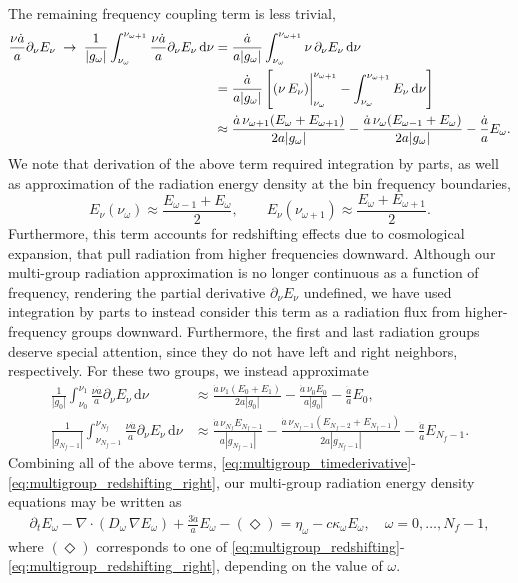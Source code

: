 \documentclass[10pt]{article}
\renewcommand{\(}{\left(}
\renewcommand{\)}{\right)}
\newcommand{\adot}{\dot{a}}
\newcommand{\Enu}{E_{\nu}}
\begin{document}
The remaining frequency coupling term is less trivial,
\begin{align}
\notag
   \frac{\nu \adot}{a}\partial_{\nu}\Enu \;\rightarrow\;
   \frac{1}{|g_{\omega}|} \int_{\nu_{\omega}}^{\nu_{\omega+1}} \frac{\nu \adot}{a}\partial_{\nu}\Enu\,\mathrm d\nu
   &=
   \frac{\adot}{a|g_{\omega}|} \int_{\nu_{\omega}}^{\nu_{\omega+1}} \nu\,\partial_{\nu}\Enu\,\mathrm d\nu \\
\label{eq:multigroup_redshifting}
   &=
   \frac{\adot}{a|g_{\omega}|}
   \left[(\nu\,\Enu)\bigg\vert_{\nu_{\omega}}^{\nu_{\omega+1}} - \int_{\nu_{\omega}}^{\nu_{\omega+1}} \Enu\,\mathrm d\nu\right]\\
\notag
   &\approx
   \frac{\adot\, \nu_{\omega+1} (E_{\omega}+E_{\omega+1})}{2a|g_{\omega}|} -
   \frac{\adot\, \nu_{\omega} (E_{\omega-1}+E_{\omega})}{2a|g_{\omega}|} - \frac{\adot}{a}E_{\omega}.
\end{align}
We note that derivation of the above term required integration by
parts, as well as approximation of the radiation energy density at the
bin frequency boundaries, 
\[
   \Enu(\nu_{\omega}) \approx \frac{E_{\omega-1}+E_{\omega}}{2}, \qquad
   \Enu(\nu_{\omega+1}) \approx \frac{E_{\omega}+E_{\omega+1}}{2}.
\]
Furthermore, this term accounts for redshifting
effects due to cosmological expansion, that pull radiation from higher
frequencies downward.  Although our multi-group radiation approximation
is no longer continuous as a function of frequency, rendering the
partial derivative $\partial_\nu\Enu$ undefined, we have used
integration by parts to instead consider this term as a radiation flux
from higher-frequency groups downward.  Furthermore, the first and
last radiation groups deserve special attention, since they do not
have left and right neighbors, respectively.  For these two groups, we
instead approximate
\begin{align}
 \label{eq:multigroup_redshifting_left}
   \frac{1}{|g_0|} \int_{\nu_0}^{\nu_1} \frac{\nu \adot}{a}\partial_{\nu}\Enu\,\mathrm d\nu
   &\approx
   \frac{\adot\, \nu_1 (E_0+E_1)}{2a|g_0|} -
   \frac{\adot\, \nu_0 E_0}{a|g_0|} - \frac{\adot}{a}E_0,
\\
 \label{eq:multigroup_redshifting_right}
   \frac{1}{|g_{N_f-1}|} \int_{\nu_{N_f-1}}^{\nu_{N_f}} \frac{\nu \adot}{a}\partial_{\nu}\Enu\,\mathrm d\nu
   &\approx
   \frac{\adot\, \nu_{N_f} E_{N_f-1}}{a|g_{N_f-1}|} -
   \frac{\adot\, \nu_{N_f-1} (E_{N_f-2}+E_{N_f-1})}{2a|g_{N_f-1}|} - \frac{\adot}{a}E_{N_f-1}.
\end{align}
Combining all of the above terms,
\eqref{eq:multigroup_timederivative}-\eqref{eq:multigroup_redshifting_right},
our multi-group radiation energy density equations may be written as
\begin{align}
  \label{eq:mgfld_multigroup}
  \partial_{t} E_{\omega} - \nabla\cdot(D_{\omega}\,\nabla E_{\omega}) 
      + \frac{3 \adot}{a} E_{\omega} - (\Diamond)
    = \eta_{\omega} - c \kappa_{\omega} E_{\omega},\quad \omega=0,\ldots,N_f-1,
\end{align}
where $(\Diamond)$ corresponds to one of
\eqref{eq:multigroup_redshifting}-\eqref{eq:multigroup_redshifting_right},
depending on the value of $\omega$.
\end{document}
